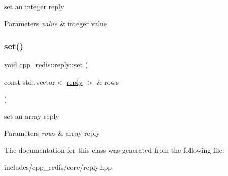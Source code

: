set an integer reply


\begin{DoxyParams}{Parameters}
{\em value} & integer value \\
\hline
\end{DoxyParams}
\mbox{\label{classcpp__redis_1_1reply_ab64ee3720832e60ed47b91fd5b3045bd}} 
\subsubsection{\texorpdfstring{set()}{set()}\hspace{0.1cm}{\footnotesize\ttfamily [4/4]}}
{\footnotesize\ttfamily void cpp\+\_\+redis\+::reply\+::set (\begin{DoxyParamCaption}\item[{const std\+::vector$<$ \hyperlink{classcpp__redis_1_1reply}{reply} $>$ \&}]{rows }\end{DoxyParamCaption})}

set an array reply


\begin{DoxyParams}{Parameters}
{\em rows} & array reply \\
\hline
\end{DoxyParams}


The documentation for this class was generated from the following file\+:\begin{DoxyCompactItemize}
\item 
includes/cpp\+\_\+redis/core/reply.\+hpp\end{DoxyCompactItemize}
